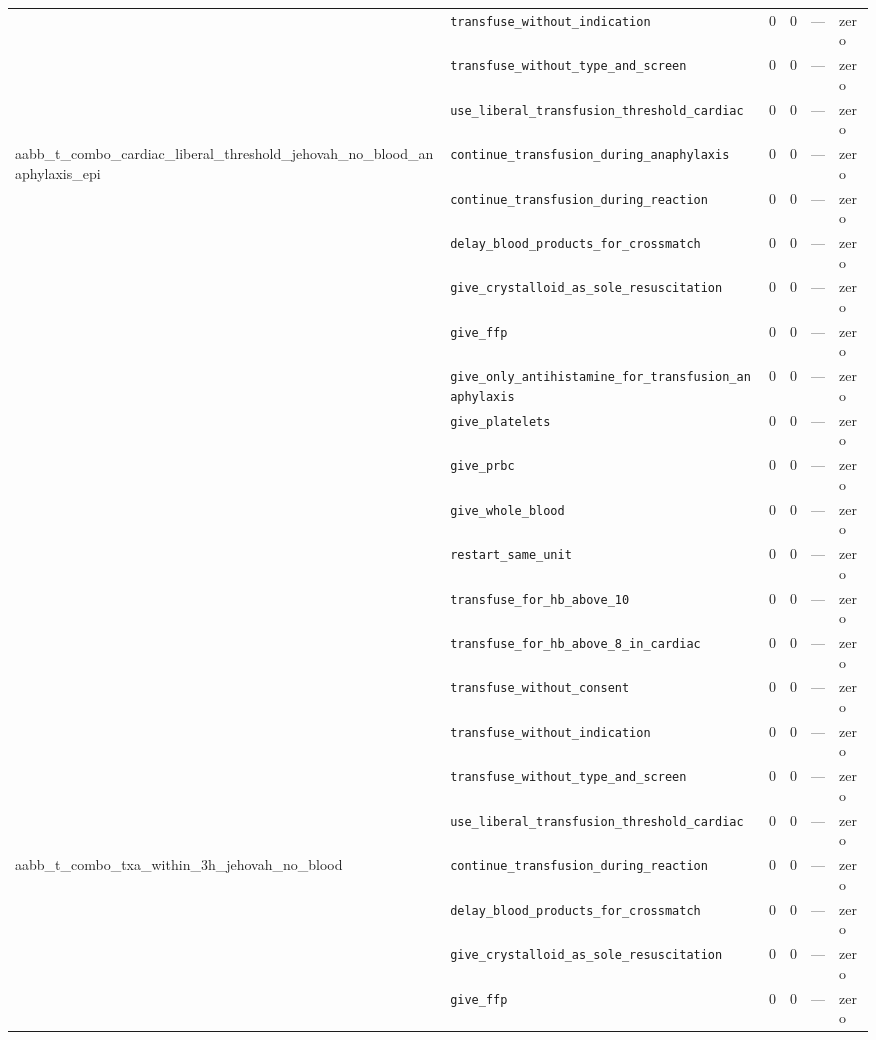 \begin{table}[ht]
\begin{tabular}{llrrrl}
 & \texttt{transfuse\_without\_indication} & 0 & 0 & — & zero \\
 & \texttt{transfuse\_without\_type\_and\_screen} & 0 & 0 & — & zero \\
 & \texttt{use\_liberal\_transfusion\_threshold\_cardiac} & 0 & 0 & — & zero \\
\midrule
aabb\_t\_combo\_cardiac\_liberal\_threshold\_jehovah\_no\_blood\_anaphylaxis\_epi & \texttt{continue\_transfusion\_during\_anaphylaxis} & 0 & 0 & — & zero \\
 & \texttt{continue\_transfusion\_during\_reaction} & 0 & 0 & — & zero \\
 & \texttt{delay\_blood\_products\_for\_crossmatch} & 0 & 0 & — & zero \\
 & \texttt{give\_crystalloid\_as\_sole\_resuscitation} & 0 & 0 & — & zero \\
 & \texttt{give\_ffp} & 0 & 0 & — & zero \\
 & \texttt{give\_only\_antihistamine\_for\_transfusion\_anaphylaxis} & 0 & 0 & — & zero \\
 & \texttt{give\_platelets} & 0 & 0 & — & zero \\
 & \texttt{give\_prbc} & 0 & 0 & — & zero \\
 & \texttt{give\_whole\_blood} & 0 & 0 & — & zero \\
 & \texttt{restart\_same\_unit} & 0 & 0 & — & zero \\
 & \texttt{transfuse\_for\_hb\_above\_10} & 0 & 0 & — & zero \\
 & \texttt{transfuse\_for\_hb\_above\_8\_in\_cardiac} & 0 & 0 & — & zero \\
 & \texttt{transfuse\_without\_consent} & 0 & 0 & — & zero \\
 & \texttt{transfuse\_without\_indication} & 0 & 0 & — & zero \\
 & \texttt{transfuse\_without\_type\_and\_screen} & 0 & 0 & — & zero \\
 & \texttt{use\_liberal\_transfusion\_threshold\_cardiac} & 0 & 0 & — & zero \\
\midrule
aabb\_t\_combo\_txa\_within\_3h\_jehovah\_no\_blood & \texttt{continue\_transfusion\_during\_reaction} & 0 & 0 & — & zero \\
 & \texttt{delay\_blood\_products\_for\_crossmatch} & 0 & 0 & — & zero \\
 & \texttt{give\_crystalloid\_as\_sole\_resuscitation} & 0 & 0 & — & zero \\
 & \texttt{give\_ffp} & 0 & 0 & — & zero \\

\end{tabular}
\end{table}
